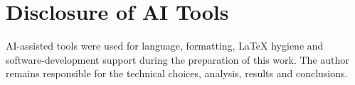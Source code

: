 \section*{Disclosure of AI Tools}

AI-assisted tools were used for language, formatting, LaTeX hygiene and
software-development support during the preparation of this work. The author
remains responsible for the technical choices, analysis, results and
conclusions.
